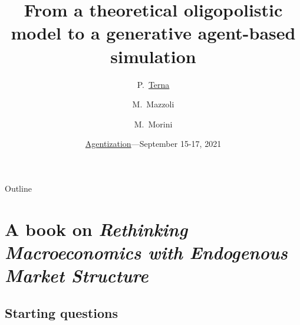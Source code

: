 \documentclass[9pt]{beamer}
\title [Oligopolistic ABM] %
{From a theoretical oligopolistic model to a generative agent-based simulation}
\author[] %
{P.~\href{https://terna.to.it}{Terna}\inst{1~2} \and M.~Mazzoli\inst{3} \and M.~Morini\inst{4~5}  }
\institute[] %
{
  \inst{1}%
 University of Torino, Italy
  \and
 \inst{2}%
  Fondazione Collegio Carlo Alberto, Honorary Fellow, Italy
 \and
  \inst{3}%
 University of Genova, Italy 
  \and
  \inst{4}%
  Credimi S.p.A., Milano, Italy
  \and
  \inst{5}%
 Ronin Institute, Montclair, New Jersey, US
  }
\date[] %
{\href{http://proteusfoundationseries.org/event/first-international-workshop-on-agentization-rendering-conventional-models-with-agent-based-computing/}{Agentization}---September 15-17, 2021}
\begin{document}
\begin{frame}
\noindent\makebox[\linewidth]{\rule{\paperwidth}{0.4pt}}

\titlepage

\end{frame}

\begin{frame}{Outline}

  \tableofcontents
\end{frame}

\section{A book on \emph{Rethinking Macroeconomics with Endogenous Market Structure}}

\subsection{Starting questions}
\end{document}
